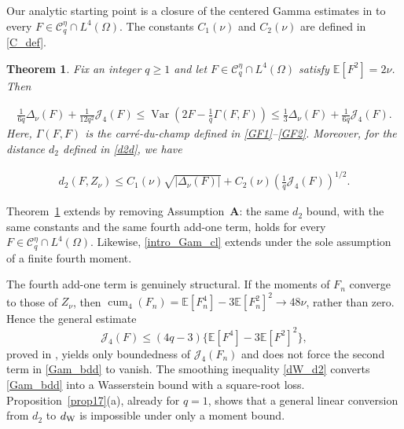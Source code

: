 \documentclass[letterpaper,11pt,reqno]{amsart}
\numberwithin{equation}{section}
\theoremstyle{plain}
\newtheorem{theorem}{Theorem}[section]
\theoremstyle{definition}
\theoremstyle{remark}
\newcommand{\E}{\mathbb{E}}
\newcommand{\cC}{\mathcal{C}}
\DeclareMathOperator{\Var}{Var}
\DeclareMathOperator{\cum}{cum}
\newcommand{\noi}{\noindent}
\newcommand{\Jfour}{\mathcal J_4}
\newcommand{\dW}{d_{\rm W}}
\newcommand{\Del}{\Delta}
\newcommand{\Gam}{\Gamma}
\begin{document}
Our analytic starting point is a closure of the centered Gamma
estimates in \cite{DP18b} to every
$F\in\cC_q^\eta\cap L^4(\Omega)$.  The constants $C_1(\nu)$ and
$C_2(\nu)$ are defined in \eqref{C_def}.

\begin{theorem} \label{thm1}
Fix an integer $q\geq1$ and
let $F\in\cC_q^\eta\cap L^4(\Omega)$
satisfy
$\E[F^2]=2\nu$.  Then

\noi
\begin{align}
 \frac1{6q}\Del_\nu(F)+\frac1{12q^2}\Jfour(F)
 \leq\Var\left(2F-\frac1q\Gam(F,F)\right)
 \leq\frac13\Del_\nu(F)+\frac1{6q}\Jfour(F).
 \label{intro_Gam_cl}
\end{align}
Here, $\Gam(F,F)$ is the carr\'e-du-champ defined in
\eqref{GF1}--\eqref{GF2}.  Moreover, for the distance $d_2$ defined in
\eqref{d2d},
we have


\noi
\begin{align}
 d_2(F,Z_\nu)
 \leq
 C_1(\nu)\sqrt{|\Del_\nu(F)|}
 +C_2(\nu)
 \left(\frac1q\Jfour(F)\right)^{1/2}.
 \label{Gam_bdd}
\end{align}
\end{theorem}


Theorem~\ref{thm1} extends \cite[Theorem~1.7]{DP18b} by removing
Assumption~$\mathbf A$: the same $d_2$ bound, with the same constants and
the same fourth add-one term, holds for every
$F\in\cC_q^\eta\cap L^4(\Omega)$.  Likewise, \eqref{intro_Gam_cl}
extends \cite[Lemma~5.3]{DP18b} under the sole assumption of a finite
fourth moment.

The fourth add-one term is genuinely structural.  If the moments of
$F_n$ converge to those of $Z_\nu$, then
$\cum_4(F_n)=\E[F_n^4]-3\E[F_n^2]^2\to48\nu$, rather than zero.  Hence
the general estimate
\[
 \Jfour(F)\leq(4q-3)\bigl\{\E[F^4]-3\E[F^2]^2\bigr\},
\]
proved in \cite[Theorem~1.8]{Zhe26a}, yields only boundedness of
$\Jfour(F_n)$ and does not force the second term in \eqref{Gam_bdd} to
vanish.  The smoothing inequality \eqref{dW_d2} converts
\eqref{Gam_bdd} into a Wasserstein bound with a square-root loss.
Proposition~\ref{prop17}(a), already for $q=1$, shows that a general
linear conversion from $d_2$ to $\dW$ is impossible under only a
moment bound.
\end{document}
